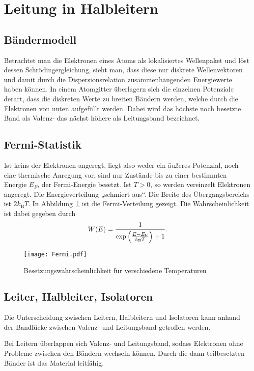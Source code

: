 \section{Leitung in Halbleitern}

\subsection{Bändermodell}

Betrachtet man die Elektronen eines Atoms als lokalisiertes Wellenpaket und
löst dessen Schrödingergleichung, sieht man, dass diese nur diskrete
Wellenvektoren und damit durch die Dispersionsrelation zusammenhängenden
Energiewerte haben können. In einem Atomgitter überlagern sich die einzelnen
Potenziale derart, dass die diskreten Werte zu breiten Bändern werden, welche
durch die Elektronen von unten aufgefüllt werden. Dabei wird das höchste noch
besetzte Band als Valenz- das nächst höhere als Leitungsband bezeichnet.

\subsection{Fermi-Statistik}

Ist keins der Elektronen angeregt, liegt also weder ein äußeres Potenzial,
noch eine thermische Anregung vor, sind nur Zustände bis zu einer bestimmten
Energie $E_F$, der Fermi-Energie besetzt. Ist $T>0$, so werden vereinzelt
Elektronen angeregt. Die Energieverteilung „schmiert aus“. Die Breite des
Übergangsbereichs ist $2k_\text{B}T$. In Abbildung~\ref{fig:Fermi} ist die
Fermi-Verteilung gezeigt. Die Wahrscheinlichkeit ist dabei gegeben durch
\[
    W(E) = \frac{1}{\exp\del{\frac{E-E_\text{F}}{k_\text{B}T}}+1}.
\]

\begin{figure}
    \centering
    \texttt{[image: Fermi.pdf]}
    \caption{%
        Besetzungswahrscheinlichkeit für verschiedene Temperaturen
    }
    \label{fig:Fermi}
\end{figure}

\subsection{Leiter, Halbleiter, Isolatoren}

Die Unterscheidung zwischen Leitern, Halbleitern und Isolatoren kann anhand der
Bandlücke zwischen Valenz- und Leitungsband getroffen werden.

Bei Leitern überlappen sich Valenz- und Leitungsband, sodass Elektronen ohne
Probleme zwischen den Bändern wechseln können. Durch die dann teilbesetzten Bänder ist das
Material leitfähig.

